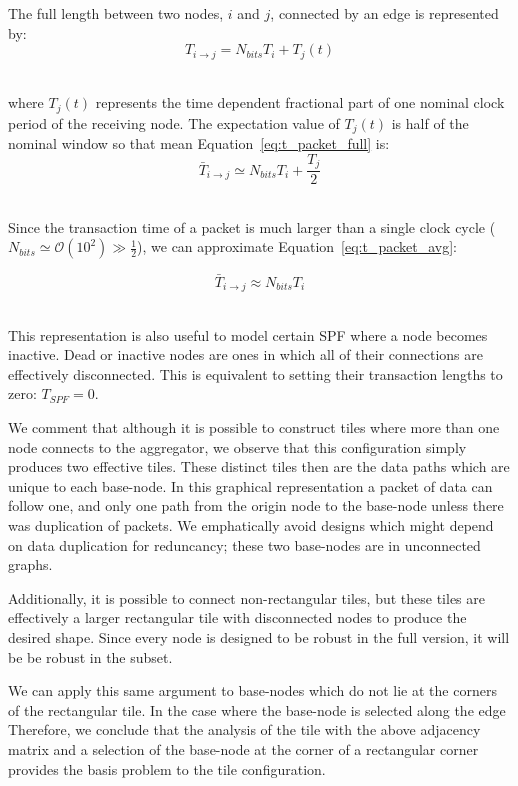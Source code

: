 The full length between two nodes, $i$ and $j$, connected by an edge is represented by:
\begin{equation}
T_{i\rightarrow j} = N_{bits}T_{i} + T_{j}(t)
\end{equation}~\label{eq:t_packet_full}

where $T_{j}(t)$ represents the time dependent fractional part of one nominal clock period of the receiving node.
The expectation value of $T_{j}(t)$ is half of the nominal window so that mean Equation~\ref{eq:t_packet_full} is:
\begin{equation}
\bar{T}_{i\rightarrow j} \simeq N_{bits}T_{i} + \frac{T_{j}}{2}
\end{equation}~\label{eq:t_packet_avg}

Since the transaction time of a packet is much larger than a single clock cycle ($N_{bits} \simeq \mathcal{O}(10^{2}) \gg \frac{1}{2}$), we can approximate Equation~\ref{eq:t_packet_avg}:

\begin{equation}
\bar{T}_{i\rightarrow j} \approx N_{bits}T_{i}
\end{equation}~\label{eq:t_packet}

This representation is also useful to model certain SPF where a node becomes inactive.
Dead or inactive nodes are ones in which all of their connections are effectively disconnected.
This is equivalent to setting their transaction lengths to zero: $T_{SPF} = 0$.

We comment that although it is possible to construct tiles where more than one node connects to the aggregator, we observe that this configuration simply produces two effective tiles.
These distinct tiles then are the data paths which are unique to each base-node.
In this graphical representation a packet of data can follow one, and only one path from the origin node to the base-node unless there was duplication of packets.
We emphatically avoid designs which might depend on data duplication for reduncancy; these two base-nodes are in unconnected graphs.

Additionally, it is possible to connect non-rectangular tiles, but these tiles are effectively a larger rectangular tile with disconnected nodes to produce the desired shape.
Since every node is designed to be robust in the full version, it will be be robust in the subset.

We can apply this same argument to base-nodes which do not lie at the corners of the rectangular tile.
In the case where the base-node is selected along the edge
Therefore, we conclude that the analysis of the tile with the above adjacency matrix and a selection of the base-node at the corner of a rectangular corner provides the basis problem to the tile configuration.


